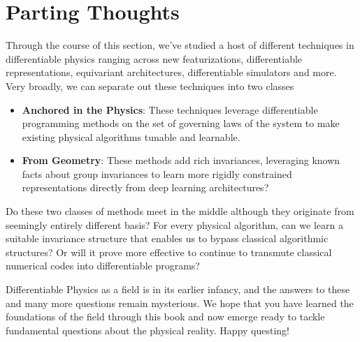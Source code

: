 \documentclass[book.tex]{subfiles}
\begin{document}
\chapter{Parting Thoughts}
\label{part:diffphys}
Through the course of this section, we've studied a host of different techniques in differentiable physics ranging across new featurizations, differentiable representations, equivariant architectures, differentiable simulators and more. Very broadly, we can separate out these techniques into two classes

\begin{itemize}
    \item \textbf{Anchored in the Physics}: These techniques leverage differentiable programming methods on the set of governing laws of the system to make existing physical algorithms tunable and learnable.
    \item \textbf{From Geometry}: These methods add rich invariances, leveraging known facts about group invariances to learn more rigidly constrained representations directly from deep learning architectures?
\end{itemize}

Do these two classes of methods meet in the middle although they originate from seemingly entirely different basis? For every physical algorithm, can we learn a suitable invariance structure that enables us to bypass classical algorithmic structures? Or will it prove more effective to continue to transmute classical numerical codes into differentiable programs?

Differentiable Physics as a field is in its earlier infancy, and the answers to these and many more questions remain mysterious. We hope that you have learned the foundations of the field through this book and now emerge ready to tackle fundamental questions about the physical reality. Happy questing!
\end{document}
